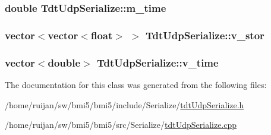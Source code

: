 \hypertarget{classTdtUdpSerialize_a5fde39b0fc2b63652da270b2986e4cf9}{
\subsubsection[{m\-\_\-time}]{\setlength{\rightskip}{0pt plus 5cm}double Tdt\-Udp\-Serialize\-::m\-\_\-time}}\label{classTdtUdpSerialize_a5fde39b0fc2b63652da270b2986e4cf9}
\hypertarget{classTdtUdpSerialize_a16c2ac300794ee519b2d4a541202d1a1}{
\subsubsection[{v\-\_\-stor}]{\setlength{\rightskip}{0pt plus 5cm}vector$<$vector$<$float$>$ $>$ Tdt\-Udp\-Serialize\-::v\-\_\-stor}}\label{classTdtUdpSerialize_a16c2ac300794ee519b2d4a541202d1a1}
\hypertarget{classTdtUdpSerialize_abe092d1d2a2c134e75c8b4c228ff8426}{
\subsubsection[{v\-\_\-time}]{\setlength{\rightskip}{0pt plus 5cm}vector$<$double$>$ Tdt\-Udp\-Serialize\-::v\-\_\-time}}\label{classTdtUdpSerialize_abe092d1d2a2c134e75c8b4c228ff8426}


The documentation for this class was generated from the following files\-:\begin{DoxyCompactItemize}
\item 
/home/ruijan/sw/bmi5/bmi5/include/\-Serialize/\hyperlink{tdtUdpSerialize_8h}{tdt\-Udp\-Serialize.\-h}\item 
/home/ruijan/sw/bmi5/bmi5/src/\-Serialize/\hyperlink{tdtUdpSerialize_8cpp}{tdt\-Udp\-Serialize.\-cpp}\end{DoxyCompactItemize}
